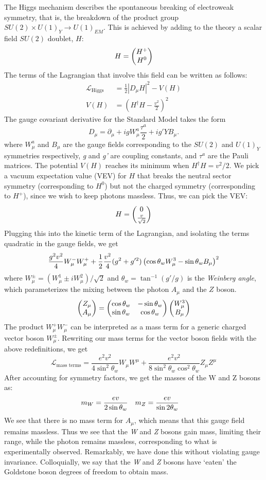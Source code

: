 The Higgs mechanism describes the spontaneous breaking of electroweak symmetry, that is, the breakdown of the product group $SU(2)\times U(1)_Y\rightarrow U(1)_{EM}$. This is achieved by adding to the theory a scalar field $SU(2)$ doublet, $H$:
$$H = \begin{pmatrix} H^+ \\ H^0\end{pmatrix}$$
The terms of the Lagrangian that involve this field can be written as follows:
\begin{align}
  \label{eq:higgs_kinetic}
  \mathcal{L}_{\text{Higgs}} &= \frac{1}{2}\left|D_\mu H\right|^2-V(H)\\
  \label{eq:higgs_potential}
  V(H) &= \left(H^\dag H-\frac{v^2}{2}\right)^2
\end{align}
The gauge covariant derivative for the Standard Model takes the form
$$D_\mu = \partial_\mu + igW_\mu^a\frac{\tau^a}{2}+ig'YB_\mu.$$
where $W_\mu^a$ and $B_\mu$ are the gauge fields corresponding to the $SU(2)$ and $U(1)_Y$ symmetries respectively, \emph{g} and \emph{g'} are coupling constants, and $\tau^a$ are the Pauli matrices. The potential $V(H)$ reaches its minimum when $H^\dag H = v^2 / 2$. We pick a vacuum expectation value (VEV) for $H$ that breaks the neutral sector symmetry (corresponding to $H^0$) but not the charged symmetry (corresponding to $H^{+}$), since we wish to keep photons massless. Thus, we can pick the VEV:
$$H = \begin{pmatrix} 0 \\ \frac{v}{\sqrt{2}}\end{pmatrix}$$
Plugging this into the kinetic term of the Lagrangian, and isolating the terms quadratic in the gauge fields, we get
\[\frac{g^2v^2}{4}W_\mu^-W_\mu^++\frac{1}{2}\frac{v^2}{4}(g^2+g'^2)
\left(\cos\theta_w W_\mu^3 - \sin\theta_w B_\mu\right)^2\]
where $W_\mu^\pm = (W_\mu^1\pm iW_\mu^2)/\sqrt{2}$  and $\theta_w = \tan^{-1}(g'/g)$ is the \emph{Weinberg angle}, which parameterizes the mixing between the photon $A_\mu$ and the $Z$ boson.
\begin{equation}\label{eq:z_a_mixing}
\begin{pmatrix} Z_\mu \\ A_\mu\end{pmatrix} = \begin{pmatrix} \cos\theta_w & -\sin\theta_w \\ \sin\theta_w & \cos\theta_w\end{pmatrix}
\begin{pmatrix} W_{\mu}^{3} \\ B_{\mu}\end{pmatrix}
\end{equation}
The product $W_\mu^+W_\mu^-$ can be interpreted as a mass term for a generic charged vector boson $W_\mu^\pm$. Rewriting our mass terms for the vector boson fields with the above redefinitions, we get
\[\mathcal{L}_{\text{mass terms}}=\frac{e^2v^2}{4\sin^2\theta_w}W_\mu W^\mu+
\frac{e^2v^2}{8\sin^2\theta_w\cos^2\theta_w}Z_\mu Z^\mu\]
After accounting for symmetry factors, we get the masses of the W and Z bosons as:
\begin{align*}
  m_W &=\frac{ev}{2\sin\theta_w} & 
  m_Z &=\frac{ev}{\sin2\theta_w}
\end{align*}
We see that there is no mass term for $A_\mu$, which means that this gauge field remains massless. Thus we see that the \emph{W} and \emph{Z} bosons gain mass, limiting their range, while the photon remains massless, corresponding to what is experimentally observed. Remarkably, we have done this without violating gauge invariance. Colloquially, we say that the \emph{W} and \emph{Z} bosons have `eaten' the Goldstone boson degrees of freedom to obtain mass. 

